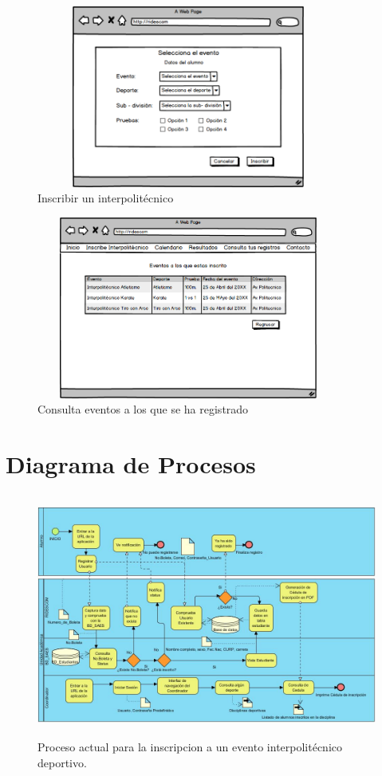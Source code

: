 		\begin{figure}[hbt!]
			\centering
			\includegraphics[width=10cm, height=6cm]{Imagenes/Disenos/p17InscripcionInterpolitecnico3.png}
			\caption{Inscribir un interpolitécnico}
			\label{Inscripcioninterpolitecnico3}
		\end{figure}
			\pagebreak
	
		\begin{figure}[hbt!]
			\centering
			\includegraphics[width=10cm, height=6cm]{Imagenes/Disenos/p18ConsultaInscripciones.png}
			\caption{Consulta eventos a los que se ha registrado}
			\label{Consultainscripciones}
		\end{figure}

	\section{Diagrama de Procesos}	
		\begin{figure}[hbt!]
			\centering
			\includegraphics[width=16cm, height=8cm]{Imagenes/Disenos/Inscripcion.jpg}
			\caption{Proceso actual para la inscripcion a un evento interpolitécnico deportivo.}
			\label{Inscripcion}
		\end{figure}
		\pagebreak
	
